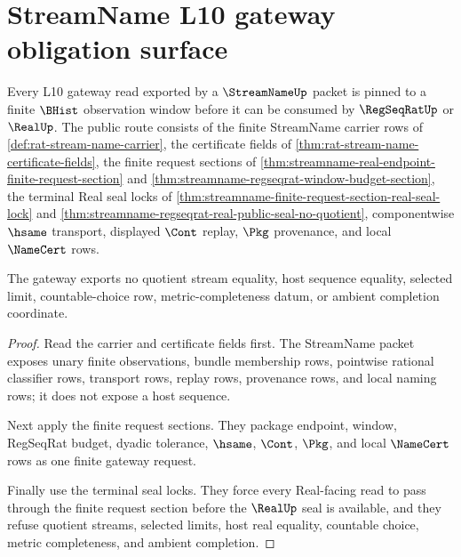 \section{StreamName L10 gateway obligation surface}
\label{sec:streamname-l10-gateway-obligation-surface}

\begin{theorem}
\label{thm:streamname-l10-gateway-namecert-obligation-surface}
Every L10 gateway read exported by a $\StreamNameUp$ packet is pinned to a finite $\BHist$ observation window before it can be consumed by $\RegSeqRatUp$ or $\RealUp$. The public route consists of the finite StreamName carrier rows of \autoref{def:rat-stream-name-carrier}, the certificate fields of \autoref{thm:rat-stream-name-certificate-fields}, the finite request sections of \autoref{thm:streamname-real-endpoint-finite-request-section} and \autoref{thm:streamname-regseqrat-window-budget-section}, the terminal Real seal locks of \autoref{thm:streamname-finite-request-section-real-seal-lock} and \autoref{thm:streamname-regseqrat-real-public-seal-no-quotient}, componentwise $\hsame$ transport, displayed $\Cont$ replay, $\Pkg$ provenance, and local $\NameCert$ rows.

The gateway exports no quotient stream equality, host sequence equality, selected limit, countable-choice row, metric-completeness datum, or ambient completion coordinate.
\end{theorem}
\begin{proof}
Read the carrier and certificate fields first. The StreamName packet exposes unary finite observations, bundle membership rows, pointwise rational classifier rows, transport rows, replay rows, provenance rows, and local naming rows; it does not expose a host sequence.

Next apply the finite request sections. They package endpoint, window, RegSeqRat budget, dyadic tolerance, $\hsame$, $\Cont$, $\Pkg$, and local $\NameCert$ rows as one finite gateway request.

Finally use the terminal seal locks. They force every Real-facing read to pass through the finite request section before the $\RealUp$ seal is available, and they refuse quotient streams, selected limits, host real equality, countable choice, metric completeness, and ambient completion.
\end{proof}

